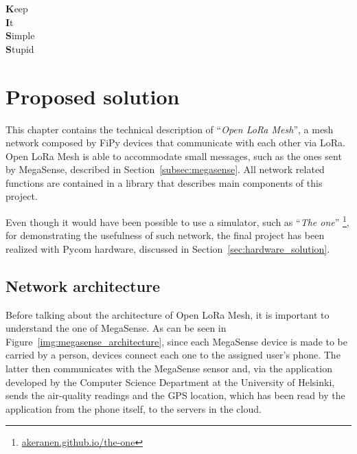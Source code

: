 
\begin{savequote}[40mm]
	\textbf{K}eep\\
	\textbf{I}t\\
	\textbf{S}imple\\
	\textbf{S}tupid
\end{savequote}

\chapter{Proposed solution}\label{chapter:proposed_solution}

	This chapter contains the technical description of ``\textit{Open LoRa Mesh}'', a mesh network composed by FiPy devices that communicate with each other via LoRa.
	Open LoRa Mesh is able to accommodate small messages, such as the ones sent by MegaSense, described in Section~\ref{subsec:megasense}.
	All network related functions are contained in a library that describes main components of this project.

	Even though it would have been possible to use a simulator, such as ``\textit{The one}'' \footnote{ \url{akeranen.github.io/the-one}}, for demonstrating the usefulness of such network, the final project has been realized with Pycom hardware, discussed in Section~\ref{sec:hardware_solution}.
	
	
	\section{Network architecture}\label{sec:architecture}
		
		Before talking about the architecture of Open LoRa Mesh, it is important to understand the one of MegaSense.
		As can be seen in Figure~\ref{img:megasense_architecture}, since each MegaSense device is made to be carried by a person, devices connect each one to the assigned user's phone.
		The latter then communicates with the MegaSense sensor and, via the application developed by the Computer Science Department at the University of Helsinki, sends the air-quality readings and the GPS location, which has been read by the application from the phone itself, to the servers in the cloud.
		
